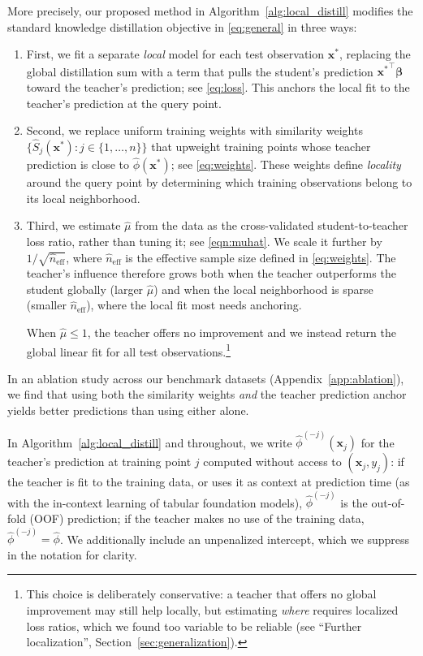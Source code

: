 \documentclass[12pt]{article}
\theoremstyle{definition}
\begin{document}
More precisely, our proposed method in Algorithm~\ref{alg:local_distill} modifies the standard knowledge distillation objective in \eqref{eq:general} in three ways:
\begin{enumerate}[leftmargin=*]
\item First, we fit a separate \emph{local} model for each test observation $\bm{x}^*$, replacing the global distillation sum with a term that pulls the student's prediction ${\bm x^*}^\top \bm \beta$ toward the teacher's prediction; see \eqref{eq:loss}. This anchors the local fit to the teacher's prediction at the query point.  
\item Second, we replace uniform training weights with similarity weights ${\{\hat{S}_j(\bm{x}^*): j \in \{1,\ldots, n\}\}}$ that upweight training points whose teacher prediction is close to $\hat\phi(\bm{x}^*)$; see \eqref{eq:weights}. These weights define \emph{locality} around the query point by determining which training observations belong to its local neighborhood.
\item Third, we estimate $\hat\mu$ from the data as the cross-validated student-to-teacher loss ratio, rather than tuning it; see \eqref{eqn:muhat}.
We scale it further by $1/\sqrt{\hat n_{\text{eff}}}$, where $\hat n_{\text{eff}}$ is the effective sample size defined in \eqref{eq:weights}. 
The teacher's influence therefore grows both when the teacher outperforms the student globally (larger $\hat\mu$) and when the local neighborhood is sparse (smaller $\hat n_{\text{eff}}$), where the local fit most needs anchoring. 

When $\hat\mu \le 1$, the teacher offers no improvement and we instead return the global linear fit for all test observations.\footnote{This choice is deliberately conservative: a teacher that offers no global improvement may still help locally, but estimating \textit{where} requires localized loss ratios, which we found too variable to be reliable (see ``Further localization'', Section~\ref{sec:generalization}).}
\end{enumerate}

In an ablation study across our benchmark datasets (Appendix~\ref{app:ablation}), we find that using both the similarity weights \textit{and} the teacher prediction anchor yields better predictions than using either alone.



In Algorithm~\ref{alg:local_distill} and throughout, we write $\hat\phi^{(-j)}(\bm{x}_j)$ for the teacher's prediction at training point $j$ computed without access to $(\bm{x}_j, y_j)$: if the teacher is fit to the training data, or uses it as context at prediction time (as with the in-context learning of tabular foundation models), $\hat\phi^{(-j)}$ is the out-of-fold (OOF) prediction; if the teacher makes no use of the training data, $\hat\phi^{(-j)} = \hat\phi$. We additionally include an unpenalized intercept, which we suppress in the notation for clarity.
\end{document}
